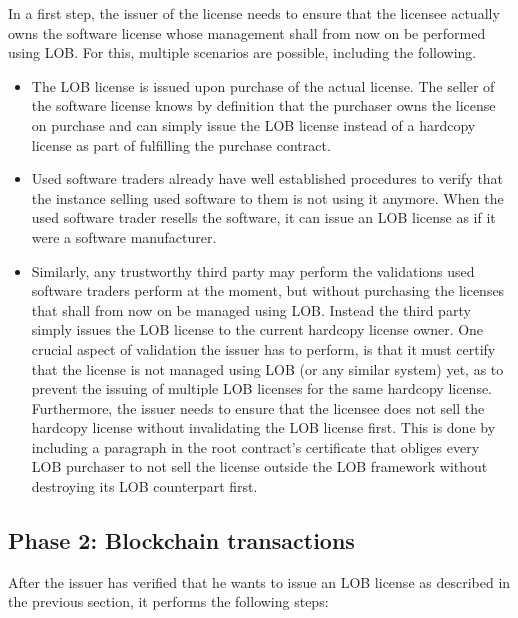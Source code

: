 \documentclass[a4paper]{article}
\begin{document}
In a first step, the issuer of the license needs to ensure that the licensee actually owns the software license whose management shall from now on be performed using LOB. For this, multiple scenarios are possible, including the following.
\begin{itemize}
  \item The LOB license is issued upon purchase of the actual license. The seller of the software license knows by definition that the purchaser owns the license on purchase and can simply issue the LOB license instead of a hardcopy license as part of fulfilling the purchase contract.

  \item Used software traders already have well established procedures to verify that the instance selling used software to them is not using it anymore. When the used software trader resells the software, it can issue an LOB license as if it were a software manufacturer.

  \item Similarly, any trustworthy third party may perform the validations used software traders perform at the moment, but without purchasing the licenses that shall from now on be managed using LOB. Instead the third party simply issues the LOB license to the current hardcopy license owner. One crucial aspect of validation the issuer has to perform, is that it must certify that the license is not managed using LOB (or any similar system) yet, as to prevent the issuing of multiple LOB licenses for the same hardcopy license. Furthermore, the issuer needs to ensure that the licensee does not sell the hardcopy license without invalidating the LOB license first. This is done by including a paragraph in the root contract's certificate that obliges every LOB purchaser to not sell the license outside the LOB framework without destroying its LOB counterpart first.
\end{itemize}

\subsection{Phase 2: Blockchain transactions}

After the issuer has verified that he wants to issue an LOB license as described in the previous section, it performs the following steps:
\end{document}
